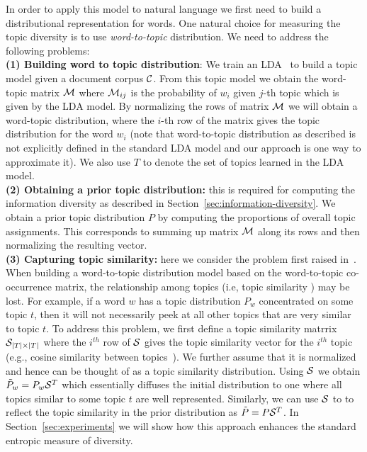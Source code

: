 \documentclass{article} %
\begin{document}
In order to apply this model to natural language we first need to build a distributional representation for words. One
natural choice for measuring the topic diversity is to use {\sl word-to-topic} distribution. We need to address the following problems:\\
{\bf (1) Building word to topic distribution}: We train an
LDA~\cite{Blei:2003:LDA:944919.944937} to build a topic model given a document corpus ${\mathcal C}$. From this topic model we obtain the
word-topic matrix ${\mathcal M}$ where ${\mathcal M}_{ij}$ is the probability of $w_i$  given $j$-th topic which is given by the LDA model. By normalizing the rows of matrix ${\mathcal M}$ we will obtain
a word-topic distribution, where the $i$-th row of the matrix gives the topic distribution for the word $w_i$ (note that word-to-topic distribution as described is not explicitly defined in the standard LDA model and our approach is one way to approximate it). We also use $T$ to denote the set of topics learned in the LDA model.\\
{\bf (2) Obtaining a prior topic distribution:} this is
required for computing the information diversity as described in Section~\ref{sec:information-diversity}. We obtain a prior
 topic distribution $P$ by computing the proportions of overall topic
 assignments. This corresponds to summing up matrix ${\mathcal M}$ along its
 rows and then normalizing the resulting vector.\\
{\bf (3) Capturing topic similarity:} here we consider the problem first raised in~\cite{bache:2013}. When building a word-to-topic distribution model based on 
the word-to-topic co-occurrence matrix, the relationship among topics (i.e, topic similarity ) may be lost. For example, if a word $w$
has a topic distribution $P_w$ concentrated on some topic $t$, then it will
not necessarily peek at all other topics that are very similar to topic $t$. To address this problem, we first define a topic similarity matrrix ${\mathcal S}_{|T|\times|T|}$
where the $i^{th}$ row of ${\mathcal S}$ gives the topic similarity vector for the $i^{th}$ topic (e.g., cosine similarity between topics~\cite{bache:2013}). We further assume that it is normalized 
and hence can be thought of as a topic similarity distribution. Using ${\mathcal S}$ we obtain $\tilde{P}_w = P_w{\mathcal S}^T$ which essentially diffuses the initial distribution to
one where  all topics similar to some topic $t$ are well represented. Similarly, we can use ${\mathcal S}$ to to reflect the topic similarity in the prior distribution as $\tilde{P} = P{\mathcal S}^T$.
In Section~\ref{sec:experiments} we will show how this
approach enhances the standard entropic measure of diversity.\\
\end{document}
